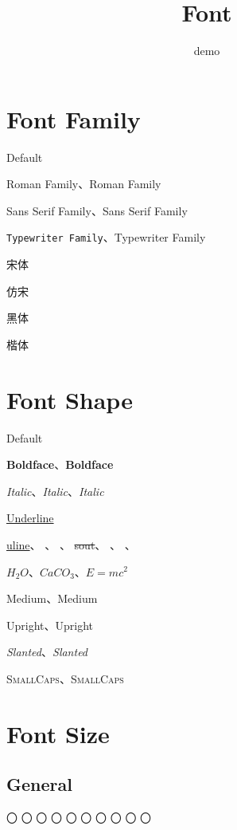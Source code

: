 \documentclass[UTF8]{ctexrep}
\title{Font}
\author{demo}
\begin{document}
\maketitle


\section{Font Family}
\par Default
\par \textrm{Roman Family}、{\rmfamily Roman Family}
\par \textsf{Sans Serif Family}、{\sffamily Sans Serif Family}
\par \texttt{Typewriter Family}、{\ttfamily Typewriter Family}
\par {\songti 宋体}
\par {\fangsong 仿宋}
\par {\heiti 黑体}
\par {\kaishu 楷体}


\section{Font Shape}
\par Default
\par \textbf{Boldface}、{\bfseries Boldface}
\par \textit{Italic}、\emph{Italic}、{\itshape Italic}
\par \underline{Underline}
\par \uline{uline}、
    、
    、
    \sout{sout}、
    、
    、
\par $H_2O$、$CaCO_3$、$E=mc^2$
\par \textmd{Medium}、{\mdseries Medium}
\par \textup{Upright}、{\upshape Upright}
\par \textsl{Slanted}、{\slshape Slanted}
\par \textsc{SmallCaps}、{\scshape SmallCaps}


\section{Font Size}

\subsection{General}
\par
{\tiny 〇}
{\scriptsize 〇}
{\footnotesize 〇}
{\small 〇}
{\normalsize 〇} %
{\large 〇}
{\Large 〇}
{\LARGE 〇}
{\huge 〇}
{\Huge 〇}
\end{document}
